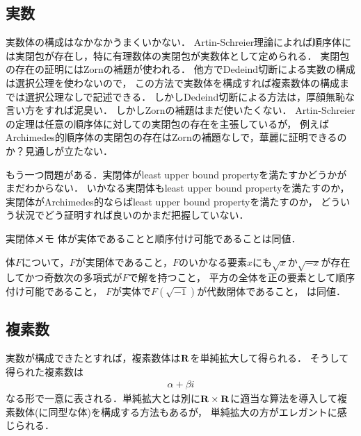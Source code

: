 \subsection{実数}
	実数体の構成はなかなかうまくいかない．
	Artin-Schreier理論によれば順序体には実閉包が存在し，特に有理数体の実閉包が実数体として定められる．
	実閉包の存在の証明にはZornの補題が使われる．
	他方でDedeind切断による実数の構成は選択公理を使わないので，
	この方法で実数体を構成すれば複素数体の構成までは選択公理なしで記述できる．
	しかしDedeind切断による方法は，厚顔無恥な言い方をすれば泥臭い．
	しかしZornの補題はまだ使いたくない．
	Artin-Schreierの定理は任意の順序体に対しての実閉包の存在を主張しているが，
	例えばArchimedes的順序体の実閉包の存在はZornの補題なしで，華麗に証明できるのか？見通しが立たない．
	
	もう一つ問題がある．実閉体がleast upper bound propertyを満たすかどうかがまだわからない． 
	いかなる実閉体もleast upper bound propertyを満たすのか，実閉体がArchimedes的ならばleast upper bound propertyを満たすのか，
	どういう状況でどう証明すれば良いのかまだ把握していない．
	
	\begin{itembox}[l]{実閉体メモ}
		体が実体であることと順序付け可能であることは同値．
		
		体$F$について，$F$が実閉体であること，$F$のいかなる要素$x$にも$\sqrt{x}$か$\sqrt{-x}$が存在してかつ奇数次の多項式が$F$で解を持つこと，
		平方の全体を正の要素として順序付け可能であること，
		$F$が実体で$F(\sqrt{-1})$が代数閉体であること，
		は同値．
	\end{itembox}
	
\subsection{複素数}
	実数が構成できたとすれば，複素数体は$\mathbf{R}$を単純拡大して得られる．
	そうして得られた複素数は
	\begin{align}
		\alpha + \beta i
	\end{align}
	なる形で一意に表される．単純拡大とは別に$\mathbf{R} \times \mathbf{R}$に適当な算法を導入して複素数体(に同型な体)を構成する方法もあるが，
	単純拡大の方がエレガントに感じられる．

\newpage